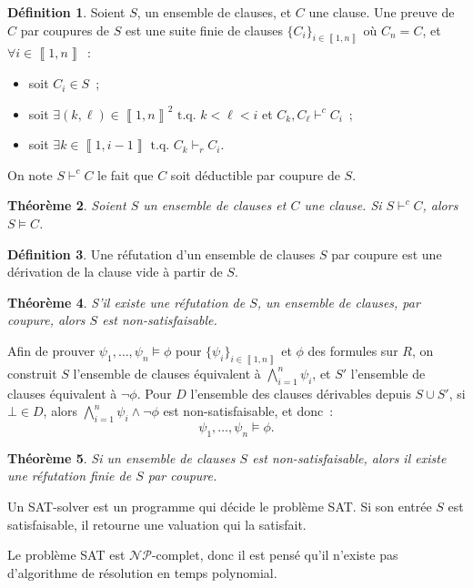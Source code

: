 \documentclass{article}
\newtheorem{thm}{Théorème}[section]
\theoremstyle{definition}
\newtheorem{déf}[thm]{Définition}
\theoremstyle{remark}
\newcommand{\intint}[2]{\left\llbracket#1, #2\right\rrbracket}
\newcommand{\tq}{\text{ t.q. }}
\newcommand{\NP}{\mathcal {NP}}
\begin{document}
	\begin{déf} Soient $S$, un ensemble de clauses, et $C$ une clause. Une preuve de $C$ par coupures de $S$ est une suite finie de clauses $\{C_i\}_{i \in \intint 1n}$
	où $C_n = C$, et $\forall i \in \intint 1n$~:
	\begin{itemize}
		\item soit $C_i \in S$~;
		\item soit $\exists (k, \ell) \in \intint 1n^2 \tq k < \ell < i$ et $C_k,C_\ell \vdash^c C_i$~;
		\item soit $\exists k \in \intint 1{i-1} \tq C_k \vdash_r C_i$.
	\end{itemize}

	On note $S \vdash^c C$ le fait que $C$ soit déductible par coupure de $S$.
	\end{déf}

	\begin{thm} Soient $S$ un ensemble de clauses et $C$ une clause. Si $S \vdash^c C$, alors $S \models C$.
	\end{thm}

	\begin{déf} Une réfutation d'un ensemble de clauses $S$ par coupure est une dérivation de la clause vide à partir de $S$.
	\end{déf}

	\begin{thm} S'il existe une réfutation de $S$, un ensemble de clauses, par coupure, alors $S$ est non-satisfaisable.
	\end{thm}

	Afin de prouver $\psi_1, \ldots, \psi_n \models \phi$ pour $\{\psi_i\}_{i \in \intint 1n}$ et $\phi$ des formules sur $R$, on construit $S$
	l'ensemble de clauses équivalent à $\bigwedge_{i=1}^n\psi_i$, et $S'$ l'ensemble de clauses équivalent à $\lnot \phi$. Pour $D$ l'ensemble
	des clauses dérivables depuis $S \cup S'$, si $\bot \in D$, alors $\bigwedge_{i=1}^n\psi_i \land \lnot \phi$ est non-satisfaisable, et donc~:
	\[\psi_1, \ldots, \psi_n \models \phi.\]

	\begin{thm} Si un ensemble de clauses $S$ est non-satisfaisable, alors il existe une réfutation finie de $S$ par coupure.
	\end{thm}

	Un SAT-solver est un programme qui décide le problème SAT. Si son entrée $S$ est satisfaisable, il retourne une valuation qui la satisfait.

	Le problème SAT est $\NP$-complet, donc il est pensé qu'il n'existe pas d'algorithme de résolution en temps polynomial.
\end{document}
